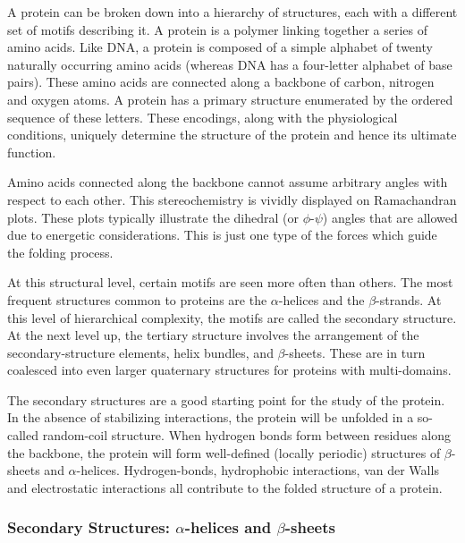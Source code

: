 A protein can be broken down into a hierarchy of structures, each with a different set of motifs describing it. A protein is a polymer linking together a series of amino acids. Like DNA, a protein is composed of a simple alphabet of twenty naturally occurring amino acids (whereas DNA has a four-letter alphabet of base pairs). These amino acids are connected along a backbone of carbon, nitrogen and oxygen atoms. A protein has a primary structure enumerated by the ordered sequence of these letters. These encodings, along with the physiological conditions, uniquely determine the structure of the protein and hence its ultimate function. 

Amino acids connected along the backbone cannot assume arbitrary angles with respect to each other.  This stereochemistry is vividly displayed on Ramachandran plots.\cite{ramachandran_stereochemistry_1963} These plots typically illustrate the dihedral (or $\phi$-$\psi$) angles that are allowed due to energetic considerations. This is just one type of the forces which guide the folding process. 

At this structural level, certain motifs are seen more often than others. The most frequent structures common to proteins are the $\alpha$-helices and the $\beta$-strands. At this level of hierarchical complexity, the motifs are called the secondary structure. At the next level up, the tertiary structure involves the arrangement of the secondary-structure elements, helix bundles, and $\beta$-sheets. These are in turn coalesced into even larger quaternary structures for proteins with multi-domains.

The secondary structures are a good starting point for the study of the protein. In the absence of stabilizing interactions, the protein will be unfolded in a so-called random-coil structure. When hydrogen bonds form between residues along the backbone, the protein will form well-defined (locally periodic) structures of $\beta$-sheets and $\alpha$-helices. Hydrogen-bonds, hydrophobic interactions, van der Walls and electrostatic interactions all contribute to the folded structure of a protein.

\subsubsection{Secondary Structures: 
  \texorpdfstring{$\alpha$}{Alpha}-helices and 
  \texorpdfstring{$\beta$}{Beta}-sheets 
}

